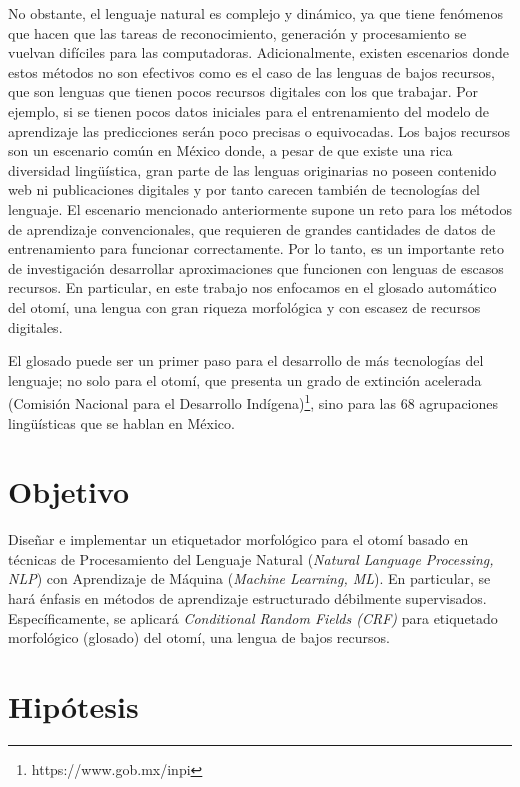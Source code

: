 \documentclass[letterpaper,12pt,oneside]{book}
\theoremstyle{definition}
\begin{document}
No obstante, el lenguaje natural es complejo y dinámico, ya que tiene fenómenos que hacen que las tareas de reconocimiento, generación y procesamiento se vuelvan difíciles para las computadoras. Adicionalmente, existen escenarios donde estos métodos no son efectivos como es el caso de las lenguas de bajos recursos, que son lenguas que tienen pocos recursos digitales con los que trabajar. Por ejemplo, si se tienen pocos datos iniciales para el entrenamiento del modelo de aprendizaje las predicciones serán poco precisas o equivocadas. Los bajos recursos son un escenario común en México donde, a pesar de que existe una rica diversidad lingüística, gran parte de las lenguas originarias no poseen contenido web ni publicaciones digitales y por tanto carecen también de tecnologías del lenguaje.  El escenario mencionado anteriormente supone un reto para los métodos de aprendizaje convencionales, que requieren de grandes cantidades de datos de entrenamiento para funcionar correctamente. Por lo tanto, es un importante reto de investigación desarrollar aproximaciones que funcionen con lenguas de escasos recursos. En particular, en este trabajo nos enfocamos en el glosado automático del otomí, una lengua con gran riqueza morfológica y con escasez de recursos digitales.

El glosado puede ser un primer paso para el desarrollo de más tecnologías del lenguaje; no solo para el otomí, que presenta un grado de extinción acelerada (Comisión Nacional para el Desarrollo Indígena)\footnote{https://www.gob.mx/inpi}, sino para las 68 agrupaciones lingüísticas que se hablan en México.

\section{Objetivo}

Diseñar e implementar un etiquetador morfológico para el otomí basado en técnicas de Procesamiento del Lenguaje Natural (\textit{Natural Language Processing, NLP}) con Aprendizaje de Máquina (\textit{Machine Learning, ML}). En particular, se hará énfasis en métodos de aprendizaje estructurado débilmente supervisados. Específicamente, se aplicará \textit{Conditional Random Fields (CRF)} para etiquetado morfológico (glosado) del otomí, una lengua de bajos recursos.

\section{Hipótesis}
\end{document}
